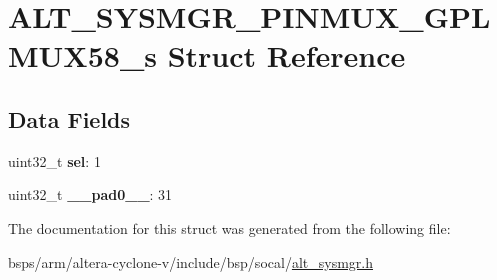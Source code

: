 \hypertarget{structALT__SYSMGR__PINMUX__GPLMUX58__s}{}\section{A\+L\+T\+\_\+\+S\+Y\+S\+M\+G\+R\+\_\+\+P\+I\+N\+M\+U\+X\+\_\+\+G\+P\+L\+M\+U\+X58\+\_\+s Struct Reference}
\label{structALT__SYSMGR__PINMUX__GPLMUX58__s}
\subsection*{Data Fields}
\begin{DoxyCompactItemize}
\item 
\mbox{\label{structALT__SYSMGR__PINMUX__GPLMUX58__s_af05d5488e588e0df9132a40581491920}} 
uint32\+\_\+t {\bfseries sel}\+: 1
\item 
\mbox{\label{structALT__SYSMGR__PINMUX__GPLMUX58__s_a9d1bcd027eb2ba5b8be6fd49b0e022de}} 
uint32\+\_\+t {\bfseries \+\_\+\+\_\+pad0\+\_\+\+\_\+}\+: 31
\end{DoxyCompactItemize}


The documentation for this struct was generated from the following file\+:\begin{DoxyCompactItemize}
\item 
bsps/arm/altera-\/cyclone-\/v/include/bsp/socal/\mbox{\hyperlink{alt__sysmgr_8h}{alt\+\_\+sysmgr.\+h}}\end{DoxyCompactItemize}
